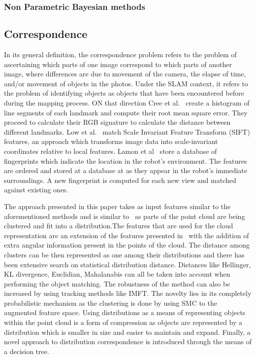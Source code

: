 \documentclass[twoside]{article}
\begin{document}
\begin{multicols}{2}
\subsubsection{Non Parametric Bayesian methods}



\subsection{Correspondence}

In its general definition, the correspondence problem refers to the problem of ascertaining which parts of one image correspond to which parts of another image, where differences are due to movement of the camera, the elapse of time, and/or movement of objects in the photos. Under the SLAM context, it refers to the problem of identifying objects as objects that have been encountered before during the mapping process. ON that direction Cree et al.~\cite{corresp:first} create a histogram of line segments of each landmark and compute their root mean square error. They proceed to calculate their RGB signature to calculate the distance between different landmarks. Low et al.~\cite{corres:sec} match Scale Invariant Feature Transform (SIFT) features, an approach which transforms image data into scale-invariant coordinates relative to local features. Lamon et al~\cite{corres:three} store a database of fingerprints which indicate the location in the robot's environment. The features are ordered and stored at a database at as they appear in the robot's immediate surroundings. A new fingerprint is computed for each new view and matched against existing ones.

The approach presented in this paper takes as input features similar to the aforementioned methods and is similar to~\cite{objectDisc} as parts of the point cloud are being clustered and fit into a distribution.The features that are used for the cloud representation are an extension of the features presented in~\cite{smcddp} with the addition of extra angular information present in the points of the cloud. The distance among clusters can be then represented as one among their distributions and there has been extensive search on statistical distribution distance. Distances like Hellinger, KL divergence, Euclidian, Mahalanabis can all be taken into account when performing the object matching. The robustness of the method can also be increased by using tracking methods like IMFT. The novelty lies in its completely probabilistic mechanism as the clustering is done by using SMC to the augmented feature space. Using distributions as a means of representing objects within the point cloud is a form of compression as objects are represented by a distribution which is smaller in size and easier to maintain and expand. Finally, a novel approach to distribution correspondence is introduced through the means of a decision tree.




\end{multicols}
\end{document}

